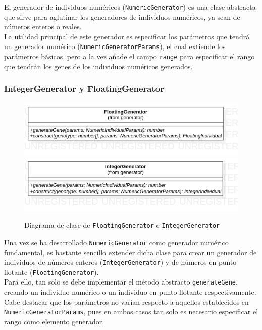 El generador de individuos numéricos (\texttt{NumericGenerator}) es una clase abstracta que sirve para aglutinar los generadores de individuos numéricos, ya sean de números enteros o reales. \\

La utilidad principal de este generador es especificar los parámetros que tendrá un generador numérico (\texttt{NumericGeneratorParams}), el cual extiende los parámetros básicos, pero a la vez añade el campo \texttt{range} para especificar el rango que tendrán los genes de los individuos numéricos generados.

\subsubsection{IntegerGenerator y FloatingGenerator}

\begin{figure}[ht]
    \centering
    \includegraphics[scale=0.42]{mem/images/cap-4/4.2.3(Generador)/FloatingGenerator.png}
    \includegraphics[scale=0.42]{mem/images/cap-4/4.2.3(Generador)/IntegerGenerator.png}
    \caption{Diagrama de clase de \texttt{FloatingGenerator} e \texttt{IntegerGenerator}}
    \label{fig:generator-uml}
\end{figure}

Una vez se ha desarrollado \texttt{NumericGenerator} como generador numérico fundamental, es bastante sencillo extender dicha clase para crear un generador de individuos de números enteros (\texttt{IntegerGenerator}) y de números en punto flotante (\texttt{FloatingGenerator}). \\

Para ello, tan solo se debe implementar el método abstracto \texttt{generateGene}, creando un individuo numérico o un individuo en punto flotante respectivamente. Cabe destacar que los parámetros no varían respecto a aquellos establecidos en \texttt{NumericGeneratorParams}, pues en ambos casos tan solo es necesario especificar el rango como elemento generador. \\

